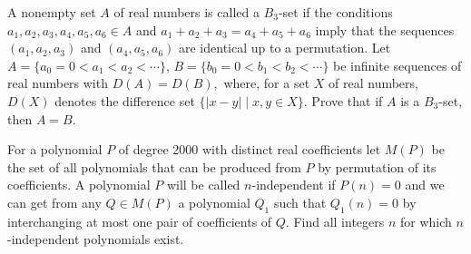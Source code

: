\item[\textbf{A6.}]A nonempty set $ A$ of real numbers is called a $ B_3$-set if the conditions $ a_1, a_2, a_3, a_4, a_5, a_6 \in A$ and $ a_1 + a_2 + a_3 = a_4 + a_5 + a_6$ imply that the sequences $ (a_1, a_2, a_3)$ and $ (a_4, a_5, a_6)$ are identical up to a permutation. Let $A = \{a_0 = 0 < a_1 < a_2 < \cdots \}$,  $B = \{b_0 = 0 < b_1 < b_2 < \cdots \}$ be infinite sequences of real numbers with $ D(A) = D(B),$ where, for a set $ X$ of real numbers, $ D(X)$ denotes the difference set $ \{|x-y|\mid x, y \in X \}.$ Prove that if $ A$ is a $ B_3$-set, then $ A = B.$

\item[\textbf{A7.}]For a polynomial $ P$ of degree 2000 with distinct real coefficients let $ M(P)$ be the set of all polynomials that can be produced from $ P$ by permutation of its coefficients. A polynomial $ P$ will be called $ n$-independent if $ P(n) = 0$ and we can get from any $ Q \in M(P)$ a polynomial $ Q_1$ such that $ Q_1(n) = 0$ by interchanging at most one pair of coefficients of $ Q.$ Find all integers $ n$ for which $ n$-independent polynomials exist.

